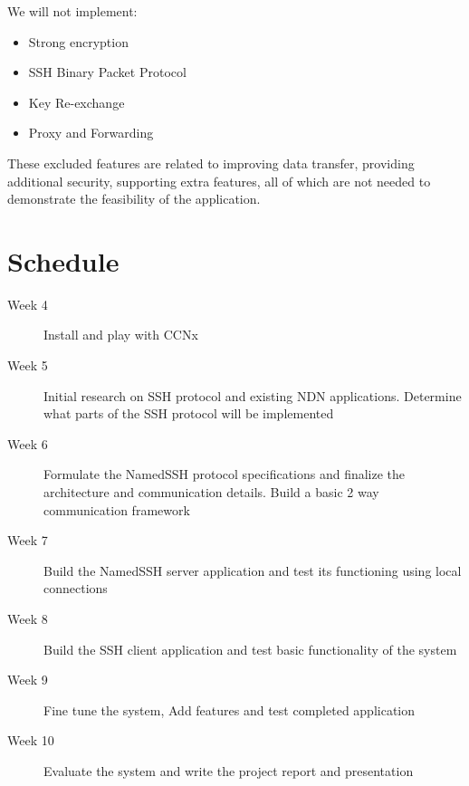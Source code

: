\documentclass{acm_proc_article-sp}
\begin{document}
We will not implement:
\begin{itemize}
    \item Strong encryption
    \item SSH Binary Packet Protocol
    \item Key Re-exchange
    \item Proxy and Forwarding
\end{itemize}

These excluded features are related to improving data transfer, providing additional security, supporting extra features, all of which are not needed to demonstrate the feasibility of the application.

\section{Schedule}

\begin{description}
    \item[Week 4] Install and play with CCNx
    \item[Week 5] Initial research on SSH protocol and existing NDN applications. Determine what parts of the SSH protocol will be implemented
    \item[Week 6] Formulate the NamedSSH protocol specifications and finalize the architecture and communication details. Build a basic 2 way communication framework
    \item[Week 7] Build the NamedSSH server application and test its functioning using local connections
    \item[Week 8] Build the SSH client application and test basic functionality of the system
    \item[Week 9] Fine tune the system, Add features and test completed application
    \item[Week 10] Evaluate the system and write the project report and presentation
\end{description}

\nocite{named-data}
\nocite{rfc4250}
\nocite{rfc4251}
\nocite{rfc4252}
\nocite{rfc4253}
\nocite{rfc4254}
\nocite{rfc4432}
\nocite{openssh}



\end{document}
